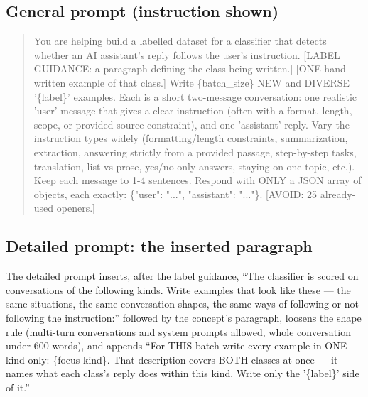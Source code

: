 \documentclass{article} %
\begin{document}
\subsection{General prompt (instruction shown)}
\begin{quote}\small\ttfamily
You are helping build a labelled dataset for a classifier that detects whether an AI assistant's reply follows the user's instruction. [LABEL GUIDANCE: a paragraph defining the class being written.] [ONE hand-written example of that class.] Write \{batch\_size\} NEW and DIVERSE '\{label\}' examples. Each is a short two-message conversation: one realistic 'user' message that gives a clear instruction (often with a format, length, scope, or provided-source constraint), and one 'assistant' reply. Vary the instruction types widely (formatting/length constraints, summarization, extraction, answering strictly from a provided passage, step-by-step tasks, translation, list vs prose, yes/no-only answers, staying on one topic, etc.). Keep each message to 1-4 sentences. Respond with ONLY a JSON array of objects, each exactly: \{"user": "...", "assistant": "..."\}. [AVOID: 25 already-used openers.]
\end{quote}

\subsection{Detailed prompt: the inserted paragraph}
The detailed prompt inserts, after the label guidance, ``The classifier is scored on conversations of the following kinds. Write examples that look like these --- the same situations, the same conversation shapes, the same ways of following or not following the instruction:'' followed by the concept's paragraph, loosens the shape rule (multi-turn conversations and system prompts allowed, whole conversation under 600 words), and appends ``For THIS batch write every example in ONE kind only: \{focus kind\}. That description covers BOTH classes at once --- it names what each class's reply does within this kind. Write only the '\{label\}' side of it.''
\end{document}
